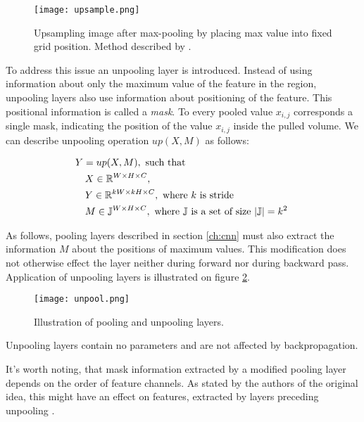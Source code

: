 \begin{figure}[h!]
  \centering
    \texttt{[image: upsample.png]}
  \caption{Upsampling image after max-pooling by placing max value into fixed grid position. Method described by \cite{Dosovitskiy2015a}.}
  \label{fig:pool}
\end{figure}

To address this issue an unpooling layer is introduced. Instead of using information about only the maximum value of the feature in the region, unpooling layers also use information about positioning of the feature. This positional information is called a \textit{mask}. To every pooled value $x_{i,j}$ corresponds a single mask, indicating the position of the value $x_{i,j}$ inside the pulled volume. We can describe unpooling operation $up(X, M)$ as follows:

\begin{equation}\label{eq:unp}
  \begin{aligned}
    & Y = up(X, M),\text{ such that} \\
    & \quad X \in \Bbb{R}^{W \times H \times C}, \\
    & \quad Y \in \Bbb{R}^{kW \times kH \times C}, \text{ where $k$ is stride } \\
    & \quad M \in \Bbb{J}^{W \times H \times C}, \text{ where $\Bbb{J}$ is a set of size $|\Bbb{J}|=k^2$ }
  \end{aligned}
\end{equation}

As follows, pooling layers described in section \ref{ch:cnn} must also extract the information $M$ about the positions of maximum values. This modification does not otherwise effect the layer neither during forward nor during backward pass. Application of unpooling layers is illustrated on figure \ref{fig:unpool}.

\begin{figure}[h!]
  \centering
    \texttt{[image: unpool.png]}
  \caption{Illustration of pooling and unpooling layers.}
  \label{fig:unpool}
\end{figure}

Unpooling layers contain no parameters and are not affected by backpropagation.

It's worth noting, that mask information extracted by a modified pooling layer depends on the order of feature channels. As stated by the authors of the original idea, this might have an effect on features, extracted by layers preceding unpooling \cite{Zhao2015}.


